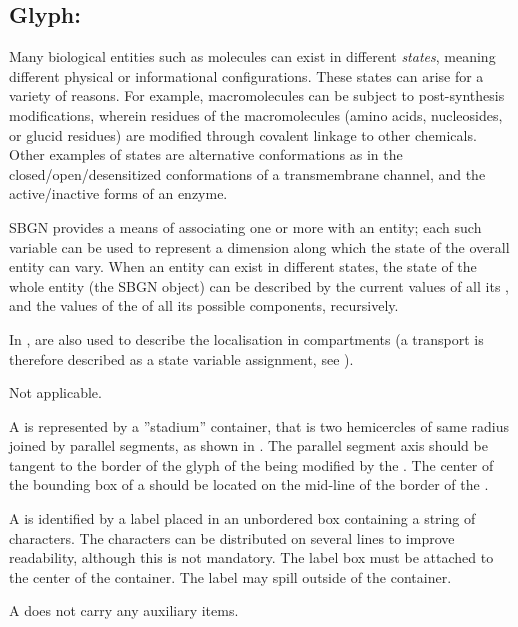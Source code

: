 \color{blue}

\subsection{Glyph: }
\label{sec:stateVariable}

Many biological entities such as molecules can exist in different \emph{states}, meaning different physical or informational configurations.  These states can arise for a variety of reasons.  For example, macromolecules can be subject to post-synthesis modifications, wherein residues of the macromolecules (amino acids, nucleosides, or glucid residues) are modified through covalent linkage to other chemicals.  Other examples of states are alternative conformations as in the closed/open/desensitized conformations of a transmembrane channel, and the active/inactive forms of an enzyme.

SBGN provides a means of associating one or more  with an entity; each such variable can be used to represent a dimension along which the state of the overall entity can vary.  When an entity can exist in different states, the state of the whole entity (\ie the SBGN object) can be described by the current values of all its , and the values of the  of all its possible components, recursively.

In \SBGNERLone,  are also used to describe the localisation in compartments (a transport is therefore described as a state variable assignment, see ).

\begin{glyphDescription}

\glyphSboTerm Not applicable.

\glyphContainer A  is represented by a ''stadium'' container, that is two hemicercles of same radius joined by parallel segments, as shown in .  The parallel segment axis should be tangent to the border of the glyph of the  being modified by the . The center of the bounding box of a  should be located on the mid-line of the border of the .

\glyphLabel A  is identified by a label placed in an unbordered box containing a string of characters.  The characters can be distributed on several lines to improve readability, although this is not mandatory.  The label box must be attached to the center of the container.  The label may spill outside of the container.

\glyphAux A  does not carry any auxiliary items.  

\end{glyphDescription}

